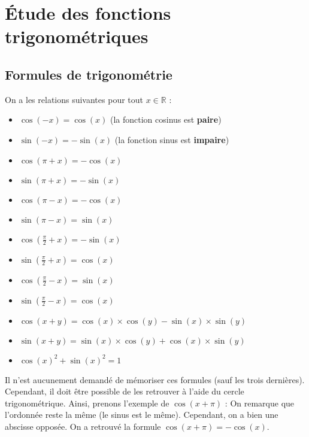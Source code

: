 	\section{Étude des fonctions trigonométriques}

	\subsection{Formules de trigonométrie}

	\begin{formula}[Formules]
		On a les relations suivantes pour tout $x \in \mathbb{R}$ :
		\begin{itemize}
			\item $\cos(-x) = \cos(x)$ (la fonction cosinus est \textbf{paire})
			\item $\sin(-x) = -\sin(x)$ (la fonction sinus est \textbf{impaire})
			\item $\cos(\pi + x) = -\cos(x)$
			\item $\sin(\pi + x) = -\sin(x)$
			\item $\cos(\pi - x) = -\cos(x)$
			\item $\sin(\pi - x) = \sin(x)$
			\item $\cos \left(\frac{\pi}{2} + x \right) = -\sin(x)$
			\item $\sin \left(\frac{\pi}{2} + x \right) = \cos(x)$
			\item $\cos \left(\frac{\pi}{2} - x \right) = \sin(x)$
			\item $\sin \left(\frac{\pi}{2} - x \right) = \cos(x)$
			\item $\cos(x + y) = \cos(x) \times \cos(y) - \sin(x) \times \sin(y)$
			\item $\sin(x + y) = \sin(x) \times \cos(y) + \cos(x) \times \sin(y)$
			\item $\cos(x)^2 + \sin(x)^2 = 1$
		\end{itemize}
	\end{formula}

	\begin{tip}
		Il n'est aucunement demandé de mémoriser ces formules (sauf les trois dernières). Cependant, il doit être possible de les retrouver à l'aide du cercle trigonométrique. Ainsi, prenons l'exemple de $\cos(x + \pi)$ :
		On remarque que l'ordonnée reste la même (le sinus est le même). Cependant, on a bien une abscisse opposée. On a retrouvé la formule $\cos(x + \pi) = -\cos(x)$.
	\end{tip}


